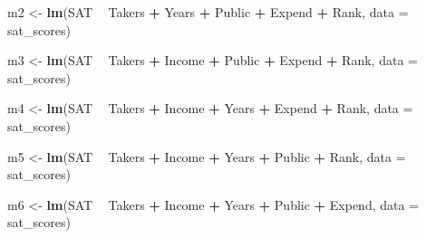 \documentclass[]{book}
\newenvironment{Shaded}{\begin{snugshade}}{\end{snugshade}}
\newcommand{\KeywordTok}[1]{\textcolor[rgb]{0.13,0.29,0.53}{\textbf{#1}}}
\newcommand{\DataTypeTok}[1]{\textcolor[rgb]{0.13,0.29,0.53}{#1}}
\newcommand{\StringTok}[1]{\textcolor[rgb]{0.31,0.60,0.02}{#1}}
\newcommand{\OperatorTok}[1]{\textcolor[rgb]{0.81,0.36,0.00}{\textbf{#1}}}
\newcommand{\NormalTok}[1]{#1}
\begin{document}
\begin{Shaded}
\begin{Highlighting}[]
\NormalTok{m2 <-}\StringTok{ }\KeywordTok{lm}\NormalTok{(SAT }\OperatorTok{~}\StringTok{ }\NormalTok{Takers }\OperatorTok{+}\StringTok{ }\NormalTok{Years }\OperatorTok{+}\StringTok{ }\NormalTok{Public }\OperatorTok{+}\StringTok{ }\NormalTok{Expend }\OperatorTok{+}\StringTok{ }\NormalTok{Rank, }\DataTypeTok{data =}\NormalTok{ sat_scores)}
\end{Highlighting}
\end{Shaded}

\begin{Shaded}
\begin{Highlighting}[]
\NormalTok{m3 <-}\StringTok{ }\KeywordTok{lm}\NormalTok{(SAT }\OperatorTok{~}\StringTok{ }\NormalTok{Takers }\OperatorTok{+}\StringTok{ }\NormalTok{Income }\OperatorTok{+}\StringTok{ }\NormalTok{Public }\OperatorTok{+}\StringTok{ }\NormalTok{Expend }\OperatorTok{+}\StringTok{ }\NormalTok{Rank, }\DataTypeTok{data =}\NormalTok{ sat_scores)}
\end{Highlighting}
\end{Shaded}

\begin{Shaded}
\begin{Highlighting}[]
\NormalTok{m4 <-}\StringTok{ }\KeywordTok{lm}\NormalTok{(SAT }\OperatorTok{~}\StringTok{ }\NormalTok{Takers }\OperatorTok{+}\StringTok{ }\NormalTok{Income }\OperatorTok{+}\StringTok{ }\NormalTok{Years }\OperatorTok{+}\StringTok{ }\NormalTok{Expend }\OperatorTok{+}\StringTok{ }\NormalTok{Rank, }\DataTypeTok{data =}\NormalTok{ sat_scores)}
\end{Highlighting}
\end{Shaded}

\begin{Shaded}
\begin{Highlighting}[]
\NormalTok{m5 <-}\StringTok{ }\KeywordTok{lm}\NormalTok{(SAT }\OperatorTok{~}\StringTok{ }\NormalTok{Takers }\OperatorTok{+}\StringTok{ }\NormalTok{Income }\OperatorTok{+}\StringTok{ }\NormalTok{Years }\OperatorTok{+}\StringTok{ }\NormalTok{Public }\OperatorTok{+}\StringTok{ }\NormalTok{Rank, }\DataTypeTok{data =}\NormalTok{ sat_scores)}
\end{Highlighting}
\end{Shaded}

\begin{Shaded}
\begin{Highlighting}[]
\NormalTok{m6 <-}\StringTok{ }\KeywordTok{lm}\NormalTok{(SAT }\OperatorTok{~}\StringTok{ }\NormalTok{Takers }\OperatorTok{+}\StringTok{ }\NormalTok{Income }\OperatorTok{+}\StringTok{ }\NormalTok{Years }\OperatorTok{+}\StringTok{ }\NormalTok{Public }\OperatorTok{+}\StringTok{ }\NormalTok{Expend, }\DataTypeTok{data =}\NormalTok{ sat_scores)}
\end{Highlighting}
\end{Shaded}
\end{document}
